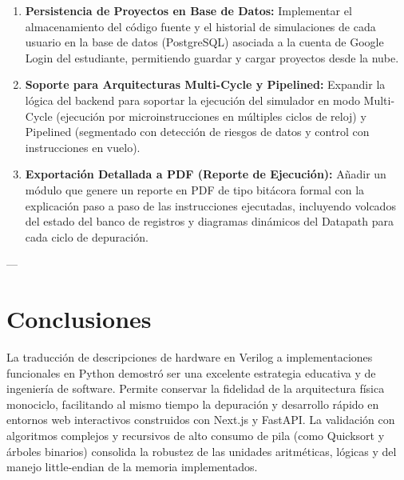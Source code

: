 \documentclass[12pt,letterpaper]{article}
\begin{document}
\begin{enumerate}
    \item \textbf{Persistencia de Proyectos en Base de Datos:} Implementar el almacenamiento del código fuente y el historial de simulaciones de cada usuario en la base de datos (PostgreSQL) asociada a la cuenta de Google Login del estudiante, permitiendo guardar y cargar proyectos desde la nube.
    \item \textbf{Soporte para Arquitecturas Multi-Cycle y Pipelined:} Expandir la lógica del backend para soportar la ejecución del simulador en modo Multi-Cycle (ejecución por microinstrucciones en múltiples ciclos de reloj) y Pipelined (segmentado con detección de riesgos de datos y control con instrucciones en vuelo).
    \item \textbf{Exportación Detallada a PDF (Reporte de Ejecución):} Añadir un módulo que genere un reporte en PDF de tipo bitácora formal con la explicación paso a paso de las instrucciones ejecutadas, incluyendo volcados del estado del banco de registros y diagramas dinámicos del Datapath para cada ciclo de depuración.
\end{enumerate}

---

\section{Conclusiones}
La traducción de descripciones de hardware en Verilog a implementaciones funcionales en Python demostró ser una excelente estrategia educativa y de ingeniería de software. Permite conservar la fidelidad de la arquitectura física monociclo, facilitando al mismo tiempo la depuración y desarrollo rápido en entornos web interactivos construidos con Next.js y FastAPI. La validación con algoritmos complejos y recursivos de alto consumo de pila (como Quicksort y árboles binarios) consolida la robustez de las unidades aritméticas, lógicas y del manejo little-endian de la memoria implementados.
\end{document}
